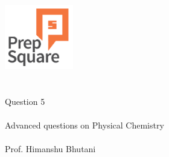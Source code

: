 \documentclass{beamer}
\begin{document}
\begin{center}
\ \\ \ \\
\includegraphics[width=30mm]{Logo-final.png} \\
\ \\ \ \\ 
{\huge Question 5 \\ \ \\ }
{\Large
Advanced questions on Physical Chemistry
}
{\large \ \\ \ \\ Prof. Himanshu Bhutani }
\end{center}
\end{document}
